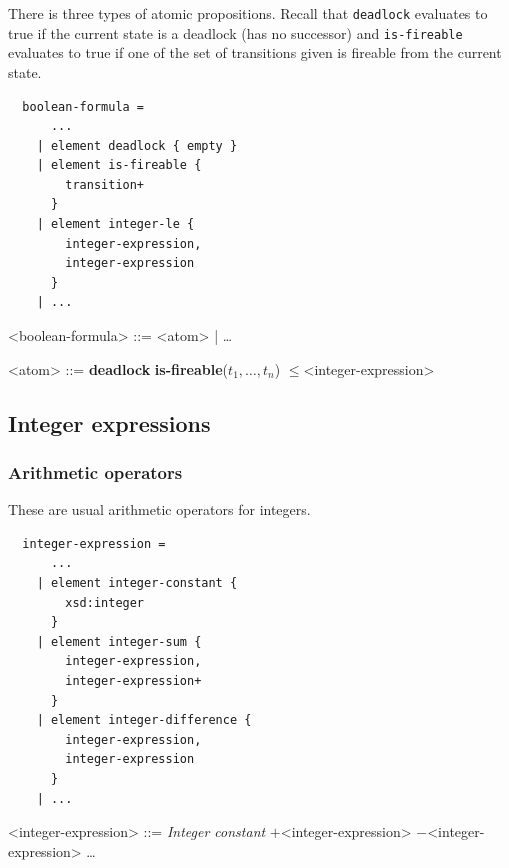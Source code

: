 \documentclass[10pt,english,a4paper]{article}
\newcommand\atomleq          {\boldmath$\leq$\xspace}
\newcommand\atomdead         {\textbf{deadlock}\xspace}
\newcommand\atomisfire[1]    {\textbf{is-fireable}(#1)}
\newcommand\exprplus         {\boldmath$+$\xspace}
\newcommand\exprminus        {\boldmath$-$\xspace}
\newcommand\mysubsection[1]{\color{sectioncolor}\subsection{#1}\color{defaultcolor}}
\begin{document}
There is three types of atomic propositions.
Recall that
\lstinline!deadlock! evaluates to true if the current state is a deadlock
(has no successor) and
\lstinline!is-fireable! evaluates to true if one of the set of transitions
given is fireable from the current state.

\begin{multicols}{2}
\begin{lstlisting}
  boolean-formula =
      ...
    | element deadlock { empty }
    | element is-fireable {
        transition+
      }
    | element integer-le {
        integer-expression,
        integer-expression
      }
    | ...
\end{lstlisting}
\columnbreak
\setlength{\grammarindent}{6em}
\begin{grammar}
<boolean-formula> ::= <atom> | \ldots

<atom> ::= \atomdead
\alt \atomisfire{$t_1, \ldots, t_n$}
 \atomleq <integer-expression>
\end{grammar}
\end{multicols}


\mysubsection{Integer expressions}




\subsubsection{Arithmetic operators}

These are usual arithmetic operators for integers.

\begin{multicols}{2}
\begin{lstlisting}
  integer-expression =
      ...
    | element integer-constant {
        xsd:integer
      }
    | element integer-sum {
        integer-expression,
        integer-expression+
      }
    | element integer-difference {
        integer-expression,
        integer-expression
      }
    | ...
\end{lstlisting}
\columnbreak
\setlength{\grammarindent}{6em}
\begin{grammar}
<integer-expression> ::=
     \textit{Integer constant}
 \exprplus <integer-expression>
 \exprminus <integer-expression>
\alt \ldots
\end{grammar}
\end{multicols}
\end{document}

